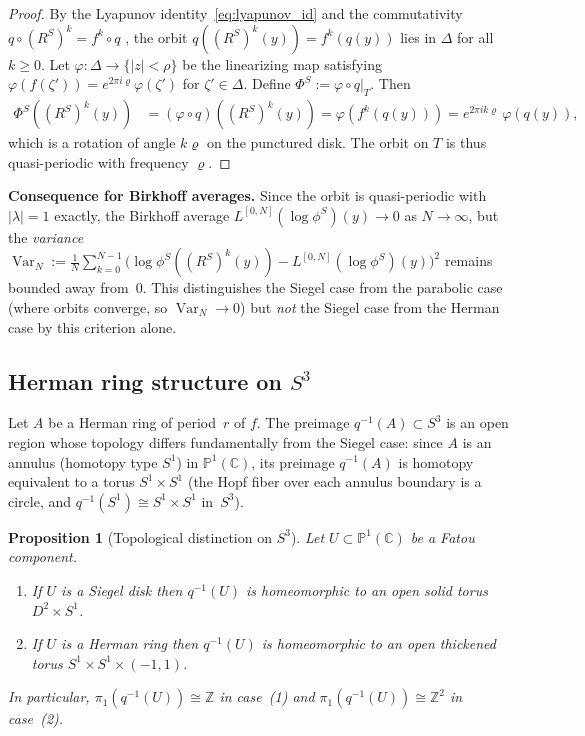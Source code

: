\documentclass[12pt,a4paper]{article}
\newtheorem{proposition}[theorem]{Proposition}
\newcommand{\Pone}{\mathbb{P}^1(\mathbb{C})}
\newcommand{\Sthree}{S^3}
\newcommand{\RS}{R^S}         %
\newcommand{\rot}{\varrho}    %
\newcommand{\Lbirk}{L^{[0,N]}}
\newcommand{\ZZ}{\mathbb{Z}}
\newcommand{\qmap}{q}         %
\begin{document}
\begin{proof}
  By the Lyapunov identity~\eqref{eq:lyapunov_id} and the commutativity
  $\qmap\circ(\RS)^k = f^k\circ\qmap$ \cite[Prop.~2]{Alvarez2023}, the
  orbit $\qmap((\RS)^k(y)) = f^k(\qmap(y))$ lies in $\Delta$ for all
  $k\ge 0$.
  Let $\varphi\colon\Delta\to\{|z|<\rho\}$ be the linearizing map satisfying
  $\varphi(f(\zeta')) = e^{2\pi i\rot}\varphi(\zeta')$ for $\zeta'\in\Delta$.
  Define $\Phi^S := \varphi\circ\qmap|_T$.
  Then
  \begin{align*}
    \Phi^S((\RS)^k(y))
    &= (\varphi\circ\qmap)((\RS)^k(y))
     = \varphi(f^k(\qmap(y)))
     = e^{2\pi i k\rot}\,\varphi(\qmap(y)),
  \end{align*}
  which is a rotation of angle $k\rot$ on the punctured disk.
  The orbit on $T$ is thus quasi-periodic with frequency $\rot$.
\end{proof}

\medskip
\noindent\textbf{Consequence for Birkhoff averages.}
Since the orbit is quasi-periodic with $|\lambda| = 1$ exactly,
the Birkhoff average $\Lbirk(\log\phi^S)(y) \to 0$ as $N\to\infty$,
but the \emph{variance}
$\operatorname{Var}_N := \frac{1}{N}\sum_{k=0}^{N-1}
  \bigl(\log\phi^S((\RS)^k(y)) - \Lbirk(\log\phi^S)(y)\bigr)^2$
remains bounded away from~$0$.
This distinguishes the Siegel case from the parabolic case
(where orbits converge, so $\operatorname{Var}_N\to 0$) but \emph{not}
the Siegel case from the Herman case by this criterion alone.

\subsection{Herman ring structure on $S^3$}
\label{ssec:herman_s3}

Let $A$ be a Herman ring of period~$r$ of $f$.
The preimage $\qmap^{-1}(A)\subset\Sthree$ is an open region whose topology
differs fundamentally from the Siegel case:
since $A$ is an annulus (homotopy type $S^1$) in $\Pone$, its preimage
$\qmap^{-1}(A)$ is homotopy equivalent to a torus $S^1\times S^1$
(the Hopf fiber over each annulus boundary is a circle, and
$\qmap^{-1}(S^1) \cong S^1\times S^1$ in~$\Sthree$).

\begin{proposition}[Topological distinction on $S^3$]
\label{prop:topology}
Let $U\subset\Pone$ be a Fatou component.
\begin{enumerate}
  \item If $U$ is a Siegel disk then $\qmap^{-1}(U)$ is homeomorphic to an
        open solid torus $D^2\times S^1$.
  \item If $U$ is a Herman ring then $\qmap^{-1}(U)$ is homeomorphic to an
        open thickened torus $S^1\times S^1\times(-1,1)$.
\end{enumerate}
In particular, $\pi_1(\qmap^{-1}(U)) \cong \ZZ$ in case~(1) and
$\pi_1(\qmap^{-1}(U)) \cong \ZZ^2$ in case~(2).
\end{proposition}
\end{document}
